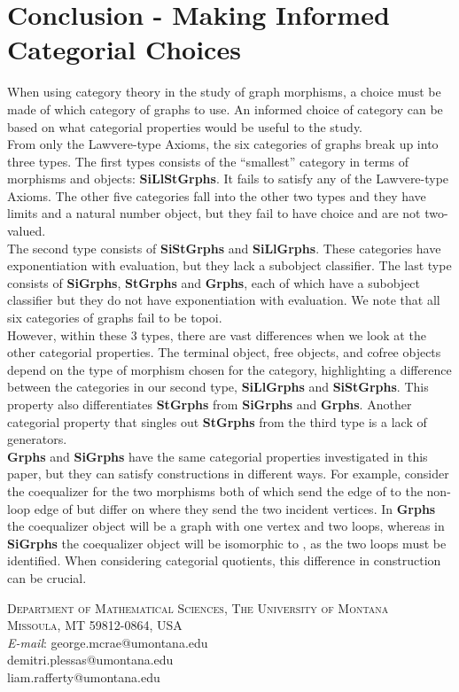 \documentclass[11pt]{article}
\begin{document}
\section{Conclusion - Making Informed Categorial Choices}
\indent When using category theory in the study of graph morphisms, a choice must be made of which category of graphs to use. An informed choice of category can be based on what categorial properties would be useful to the study.\\
\indent From only the Lawvere-type Axioms, the six categories of graphs break up into three types. The first types consists of the ``smallest'' category in terms of morphisms and objects: \textbf{SiLlStGrphs}. It fails to satisfy any of the Lawvere-type Axioms. The other five categories fall into the other two types and they have limits and a natural number object, but they fail to have choice and are not two-valued.\\
\indent The second type consists of \textbf{SiStGrphs} and \textbf{SiLlGrphs}. These categories have exponentiation with evaluation, but they lack a subobject classifier. The last type consists of \textbf{SiGrphs}, \textbf{StGrphs} and \textbf{Grphs}, each of which have a subobject classifier but they do not have exponentiation with evaluation. We note that all six categories of graphs fail to be topoi.\\
\indent However, within these 3 types, there are vast differences when we look at the other categorial properties. The terminal object, free objects, and cofree objects depend on the type of morphism chosen for the category, highlighting a difference between the categories in our second type, \textbf{SiLlGrphs} and \textbf{SiStGrphs}. This property also differentiates \textbf{StGrphs} from \textbf{SiGrphs} and \textbf{Grphs}. Another categorial property that singles out \textbf{StGrphs} from the third type is a lack of generators.\\
\indent \textbf{Grphs} and \textbf{SiGrphs} have the same categorial properties investigated in this paper, but they can satisfy constructions in different ways. For example, consider the coequalizer for the two morphisms  both of which send the edge of  to the non-loop edge of  but differ on where they send the two incident vertices. In \textbf{Grphs} the coequalizer object will be a graph with one vertex and two loops, whereas in \textbf{SiGrphs} the coequalizer object will be isomorphic to , as the two loops must be identified. When considering categorial quotients, this difference in construction can be crucial.\\




\noindent \textsc{Department of Mathematical Sciences, The University of Montana} \\
\textsc{Missoula, MT 59812-0864, USA} \\
\textit{E-mail}: george.mcrae@umontana.edu\\
\indent \qquad demitri.plessas@umontana.edu\\
\indent \qquad liam.rafferty@umontana.edu\\
\end{document}
